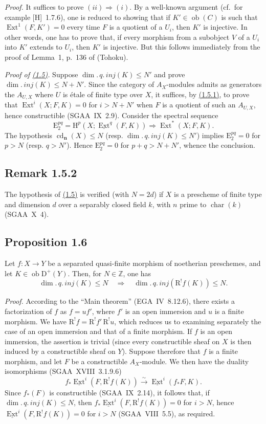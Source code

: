 \documentclass[11pt]{article}
\renewcommand{\H}{\mathrm{H}}
\DeclareMathOperator{\Ext}{Ext}
\DeclareMathOperator{\cd}{cd}
\newcommand{\R}{\mathrm{R}}
\newcommand{\D}{\mathrm{D}}
\newcommand{\Z}{\mathbb{Z}}
\newcommand{\E}{\mathrm{E}}
\newcommand{\ob}{\operatorname{ob}}
\newcommand{\charac}{\operatorname{char}}
\providecommand{\ob}{\operatorname{ob}}
\providecommand{\R}{\mathrm R}
\providecommand{\Z}{\mathbb Z}
\begin{document}
\emph{Proof.} It suffices to prove $(ii) \Rightarrow (i)$. By a well-known argument (cf.\ for example [H]~1.7.6), one is reduced to showing that if $K' \in \ob(C)$ is such that $\Ext^1(F,K') = 0$ every time $F$ is a quotient of a $U_i$, then $K'$ is injective. In other words, one has to prove that, if every morphism from a subobject $V$ of a $U_i$ into $K'$ extends to $U_i$, then $K'$ is injective. But this follows immediately from the proof of Lemma~1, p.~136 of (Tohoku).

\emph{Proof of \hyperref[sga5:I:proposition:1.5]{(1.5)}.} Suppose $\dim.\,q.\,inj(K) \leqslant N'$ and prove $\dim.\,inj(K) \leqslant N + N'$. Since the category of $A_X$-modules admits as generators the $A_{U,X}$ where $U$ is étale of finite type over $X$, it suffices, by \hyperref[sga5:I:lemma:1.5.1]{(1.5.1)}, to prove that $\Ext^i(X; F,K) = 0$ for $i > N + N'$ when $F$ is a quotient of such an $A_{U,X}$, hence constructible (SGAA~IX~2.9). Consider the spectral sequence
\[
\E_2^{pq} = \H^p(X; \underline{\Ext}^q(F,K)) \Rightarrow \Ext^{*}(X; F,K).
\]
The hypothesis $\cd_{\mathbf{n}}(X) \leqslant N$ (resp. $\dim.\,q.\,inj(K) \leqslant N'$) implies $\E_2^{pq} = 0$ for $p > N$ (resp. $q > N'$). Hence $\E_2^{pq} = 0$ for $p+q > N+N'$, whence the conclusion.

\subsection*{Remark 1.5.2}\label{sga5:I:remark:1.5.2}
The hypothesis of \hyperref[sga5:I:proposition:1.5]{(1.5)} is verified (with $N = 2d$) if $X$ is a prescheme of finite type and dimension $d$ over a separably closed field $k$, with $n$ prime to $\charac(k)$ (SGAA~X~4).

\subsection*{Proposition 1.6}\label{sga5:I:proposition:1.6}
Let $f : X \to Y$ be a separated quasi-finite morphism of noetherian preschemes, and let $K \in \ob \D^{+}(Y)$. Then, for $N \in \Z$, one has
\[
\dim.\,q.\,inj(K) \leqslant N \quad \Longrightarrow \quad \dim.\,q.\,inj(\R^{!}f(K)) \leqslant N.
\]

\emph{Proof.} According to the ``Main theorem'' (EGA~IV~8.12.6), there exists a factorization of $f$ as $f = uf'$, where $f'$ is an open immersion and $u$ is a finite morphism. We have $\R^{!}f = \R^{!}f' \, \R^{!}u$, which reduces us to examining separately the case of an open immersion and that of a finite morphism. If $f$ is an open immersion, the assertion is trivial (since every constructible sheaf on $X$ is then induced by a constructible sheaf on $Y$). Suppose therefore that $f$ is a finite morphism, and let $F$ be a constructible $A_X$-module. We then have the duality isomorphisms (SGAA~XVIII~3.1.9.6)
\[
f_{*}\underline{\Ext}^i(F, \R^{!}f(K)) \xrightarrow{\sim} \underline{\Ext}^i(f_{*}F, K).
\]
Since $f_{*}(F)$ is constructible (SGAA~IX~2.14), it follows that, if $\dim.\,q.\,inj(K) \leqslant N$, then $f_{*}\underline{\Ext}^i(F, \R^{!}f(K)) = 0$ for $i > N$, hence $\underline{\Ext}^i(F, \R^{!}f(K)) = 0$ for $i > N$ (SGAA~VIII~5.5), as required.
\end{document}
